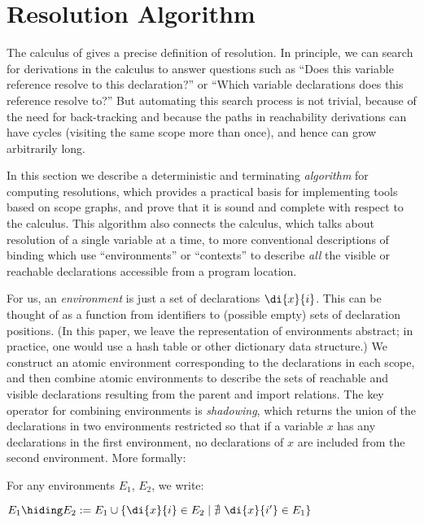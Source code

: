 \section{Resolution Algorithm}

The calculus of  gives a precise definition of resolution.
In principle, we can search for derivations in the calculus 
to answer questions such as ``Does this variable
reference resolve to this declaration?'' or ``Which variable declarations
does this reference resolve to?''  But automating this search process is not trivial, 
because of the need for back-tracking and 
because the paths in reachability derivations can have cycles (visiting
the same scope more than once), and hence can grow arbitrarily long.

In this section we describe a deterministic and terminating
\emph{algorithm} for computing resolutions,
which provides a practical basis for implementing tools based on scope graphs,
and prove that it is sound and complete with respect to the calculus.
This algorithm also connects the calculus, which talks about
resolution of a single variable at a time, to more conventional descriptions of
binding which use ``environments'' or ``contexts'' to describe \emph{all}
the visible or reachable declarations accessible from a program location.

For us, an \emph{environment} is just a set of declarations $\di{x}{i}$. 
This can be thought of as a function from identifiers to (possible empty) 
sets of declaration positions.  (In this paper, we leave the representation 
of environments abstract; in practice, one would use a hash table or other
dictionary data structure.) We construct an atomic environment corresponding
to the declarations in each scope, 
and then combine atomic environments to describe the sets of 
reachable and visible declarations resulting from the parent and import 
relations. The key operator for combining environments is {\it shadowing},
which returns the union of the declarations in two environments restricted so
that if a variable $x$ has any declarations in the first environment, no
declarations of $x$ are included from the second environment.  More formally:





\begin{definition}[Shadowing] For any environments $E_1$, $E_2$, we write:\\
\centerline{$E_1 \hiding E_2 := E_1 \cup \{ \di{x}{i} \in E_2 \mid  \nexists\ \di{x}{i'} \in
E_1\}$}
\end{definition}

